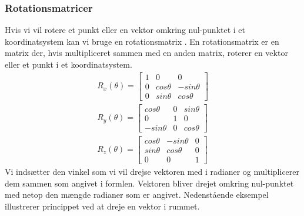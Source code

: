 \subsubsection{Rotationsmatricer}
\label{sec:rot_matricer}
Hvis vi vil rotere et punkt eller en vektor omkring nul-punktet i et koordinatsystem kan vi bruge en rotationsmatrix \cite{rotationsmatricer}.
En rotationsmatrix er en matrix der, hvis multipliceret sammen med en anden matrix, roterer en vektor eller et punkt i et koordinatsystem.
\begin{align}\label{eu_eqn}
  R_x(\theta) = 
  \begin{bmatrix}
    1 & 0 & 0\\ 
    0 & cos \theta & - sin \theta\\ 
    0 & sin \theta & cos \theta
  \end{bmatrix}\\
    R_y(\theta) =
  \begin{bmatrix}
    cos \theta  & 0 & sin \theta\\ 
    0           & 1 & 0\\ 
    -sin \theta & 0 & cos \theta
  \end{bmatrix}\\
    R_z(\theta) = 
  \begin{bmatrix}
    cos \theta & - sin \theta & 0\\ 
    sin \theta & cos \theta & 0\\
    0 & 0 & 1
  \end{bmatrix}
\end{align}
Vi indsætter den vinkel som vi vil drejse vektoren med i radianer og multiplicerer dem sammen som angivet i formlen. Vektoren bliver drejet omkring nul-punktet med netop den mængde radianer som er angivet.
Nedenstående eksempel illustrerer princippet ved at dreje en vektor i rummet.

